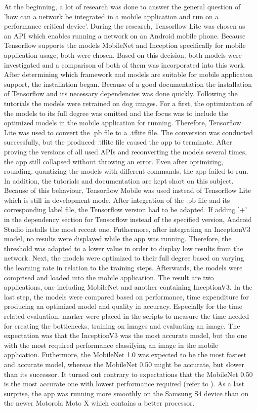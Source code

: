 At the beginning, a lot of research was done to answer the general question of 'how can a network be integrated in a mobile application and run on a performance critical device'. During the research, Tensorflow Lite was chosen as an API which enables running a network on an Android mobile phone. Because Tensorflow supports the models MobileNet and Inception specifically for mobile application usage, both were chosen. Based on this decision, both models were investigated and a comparison of both of them was incorporated into this work. After determining which framework and models are suitable for mobile applicaton support, the installation began. Because of a good documentation the installation of Tensorflow and its necessary dependencies was done quickly. Following the tutorials the models were retrained on dog images. For a first, the optimization of the models to its full degree was omitted and the focus was to include the optimized models in the mobile application for running. Therefore, Tensorflow Lite was used to convert the .pb file to a .tflite file. The conversion was conducted successfully, but the produced .tflite file caused the app to terminate. After proving the versions of all used APIs and reconverting the models several times, the app still collapsed without throwing an error. Even after optimizing, rounding, quantizing the models with different commands, the app failed to run. In addition, the tutorials and documentation are kept short on this subject. Because of this behaviour, Tensorflow Mobile was used instead of Tensorflow Lite which is still in development mode. After integration of the .pb file and its corresponding label file, the Tensorflow version had to be adapted. If adding '+' in the dependency section for Tensorflow instead of the specified version, Android Studio installs the most recent one. Futhermore, after integrating an InceptionV3 model, no results were displayed while the app was running. Therefore, the threshold was adapted to a lower value in order to display low results from the network. Next, the models were optimized to their full degree based on varying the learning rate in relation to the training steps. Afterwards, the models were comprised and loaded into the mobile application. The result are two applications, one including MobileNet and another containing InceptionV3. In the last step, the models were compared based on performance, time expenditure for producing an optimized model and quality in accuracy. Especially for the time related evaluation, marker were placed in the scripts to measure the time needed for creating the bottlenecks, training on images and evaluating an image. The expectation was that the InceptionV3 was the most accurate model, but the one with the most required performance classifying an image in the mobile application. Futhermore, the MobileNet 1.0 was expected to be the most fastest and accurate model, whereas the MobileNet 0.50 might be accurate, but slower than its successor. It turned out contrary to expectations that the MobileNet 0.50 is the most accurate one with lowest performance required (refer to ). As a last surprise, the app was running more smoothly on the Samsung S4 device than on the newer Motorola Moto X which contains a better processor.

